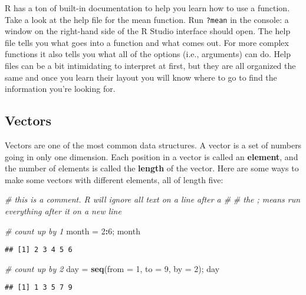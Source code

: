 \documentclass[]{book}
\newenvironment{Shaded}{\begin{snugshade}}{\end{snugshade}}
\newcommand{\KeywordTok}[1]{\textcolor[rgb]{0.13,0.29,0.53}{\textbf{#1}}}
\newcommand{\DataTypeTok}[1]{\textcolor[rgb]{0.13,0.29,0.53}{#1}}
\newcommand{\DecValTok}[1]{\textcolor[rgb]{0.00,0.00,0.81}{#1}}
\newcommand{\StringTok}[1]{\textcolor[rgb]{0.31,0.60,0.02}{#1}}
\newcommand{\CommentTok}[1]{\textcolor[rgb]{0.56,0.35,0.01}{\textit{#1}}}
\newcommand{\OperatorTok}[1]{\textcolor[rgb]{0.81,0.36,0.00}{\textbf{#1}}}
\newcommand{\NormalTok}[1]{#1}
\theoremstyle{definition}
\theoremstyle{definition}
\theoremstyle{definition}
\theoremstyle{remark}
\begin{document}
R has a ton of built-in documentation to help you learn how to use a
function. Take a look at the help file for the mean function. Run
\texttt{?mean} in the console: a window on the right-hand side of the R
Studio interface should open. The help file tells you what goes into a
function and what comes out. For more complex functions it also tells
you what all of the options (i.e., arguments) can do. Help files can be
a bit intimidating to interpret at first, but they are all organized the
same and once you learn their layout you will know where to go to find
the information you're looking for.

\subsection{Vectors}\label{vectors}

Vectors are one of the most common data structures. A vector is a set of
numbers going in only one dimension. Each position in a vector is called
an \textbf{element}, and the number of elements is called the
\textbf{length} of the vector. Here are some ways to make some vectors
with different elements, all of length five:

\begin{Shaded}
\begin{Highlighting}[]
\CommentTok{# this is a comment. R will ignore all text on a line after a #}
\CommentTok{# the ; means run everything after it on a new line}

\CommentTok{# count up by 1}
\NormalTok{month =}\StringTok{ }\DecValTok{2}\OperatorTok{:}\DecValTok{6}\NormalTok{; month}
\end{Highlighting}
\end{Shaded}

\begin{verbatim}
## [1] 2 3 4 5 6
\end{verbatim}

\begin{Shaded}
\begin{Highlighting}[]
\CommentTok{# count up by 2}
\NormalTok{day =}\StringTok{ }\KeywordTok{seq}\NormalTok{(}\DataTypeTok{from =} \DecValTok{1}\NormalTok{, }\DataTypeTok{to =} \DecValTok{9}\NormalTok{, }\DataTypeTok{by =} \DecValTok{2}\NormalTok{); day}
\end{Highlighting}
\end{Shaded}

\begin{verbatim}
## [1] 1 3 5 7 9
\end{verbatim}
\end{document}
